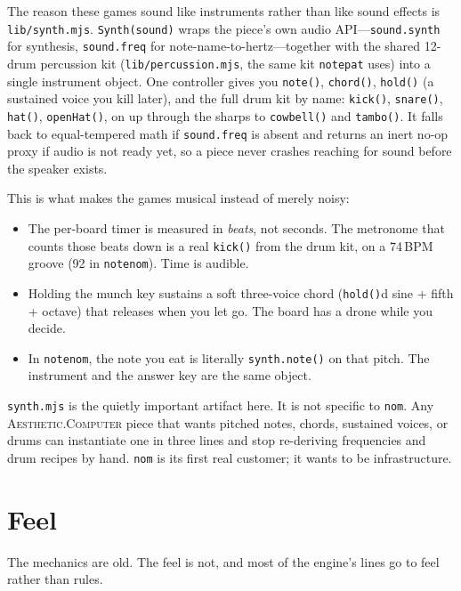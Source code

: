 \documentclass[10pt,letterpaper,twocolumn]{article}
\newcommand{\ac}{\textsc{Aesthetic.Computer}}
\begin{document}
The reason these games sound like instruments rather than like sound effects is \texttt{lib/synth.mjs}. \texttt{Synth(sound)} wraps the piece's own audio API---\texttt{sound.synth} for synthesis, \texttt{sound.freq} for note-name-to-hertz---together with the shared 12-drum percussion kit (\texttt{lib/percussion.mjs}, the same kit \texttt{notepat} uses) into a single instrument object. One controller gives you \texttt{note()}, \texttt{chord()}, \texttt{hold()} (a sustained voice you kill later), and the full drum kit by name: \texttt{kick()}, \texttt{snare()}, \texttt{hat()}, \texttt{openHat()}, on up through the sharps to \texttt{cowbell()} and \texttt{tambo()}. It falls back to equal-tempered math if \texttt{sound.freq} is absent and returns an inert no-op proxy if audio is not ready yet, so a piece never crashes reaching for sound before the speaker exists.

This is what makes the games musical instead of merely noisy:

\begin{itemize}
  \item The per-board timer is measured in \emph{beats}, not seconds. The metronome that counts those beats down is a real \texttt{kick()} from the drum kit, on a 74\,BPM groove (92 in \texttt{notenom}). Time is audible.
  \item Holding the munch key sustains a soft three-voice chord (\texttt{hold()}d sine + fifth + octave) that releases when you let go. The board has a drone while you decide.
  \item In \texttt{notenom}, the note you eat is literally \texttt{synth.note()} on that pitch. The instrument and the answer key are the same object.
\end{itemize}

\texttt{synth.mjs} is the quietly important artifact here. It is not specific to \texttt{nom}. Any \ac{} piece that wants pitched notes, chords, sustained voices, or drums can instantiate one in three lines and stop re-deriving frequencies and drum recipes by hand. \texttt{nom} is its first real customer; it wants to be infrastructure.

\section{Feel}

The mechanics are old. The feel is not, and most of the engine's lines go to feel rather than rules.
\end{document}
